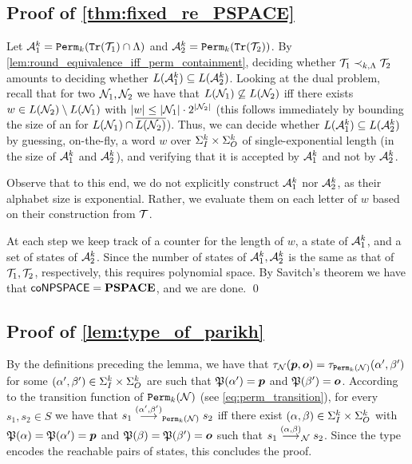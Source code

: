 \subsection{Proof of \autoref{thm:fixed_re_PSPACE}}
\label{apx:fixed_re_PSPACE}
	Let $\mathcal{A}_1^k={\mathtt{Perm}}_k({\mathtt{Tr}}(\mathcal{T}_1)\cap \Lambda)$ and $\mathcal{A}_2^k={\mathtt{Perm}}_k({\mathtt{Tr}}(\mathcal{T}_2))$. By \autoref{lem:round_equivalence_iff_perm_containment}, deciding whether $\mathcal{T}_1\prec_{k,\Lambda} \mathcal{T}_2$ amounts to deciding whether $L(\mathcal{A}^k_1)\subseteq L(\mathcal{A}^k_2)$. Looking at the dual problem, recall that for two \NFAs $\mathcal{N}_1, \mathcal{N}_2$ we have that $L(\mathcal{N}_1)\not\subseteq L(\mathcal{N}_2)$ iff 
	there exists $w\in L(\mathcal{N}_2)\setminus L(\mathcal{N}_1)$ with $|w|\le |\mathcal{N}_1|\cdot 2^{|\mathcal{N}_2|}$ (this follows immediately by bounding the size of an \NFA for $L(\mathcal{N}_1)\cap \overline{L(\mathcal{N}_2)}$). Thus, we can decide whether $L(\mathcal{A}^k_1)\subseteq L(\mathcal{A}^k_2)$ by guessing, on-the-fly, a word $w$ over $\Sigma_{I}^k\times \Sigma_{O}^k$ of single-exponential length (in the size of $\mathcal{A}^k_1$ and $\mathcal{A}^k_2$), and verifying that it is accepted by $\mathcal{A}^k_1$ and not by $\mathcal{A}^k_2$. 
	
	Observe that to this end, we do not explicitly construct $\mathcal{A}^k_1$ nor $\mathcal{A}^k_2$, as their alphabet size is exponential. Rather, we evaluate them on each letter of $w$ based on their construction from $\mathcal{T}$. 
	
	At each step we keep track of a counter for the length of $w$, a state of $\mathcal{A}^k_1$, and a set of states of $\mathcal{A}^k_2$. Since the number of states of $\mathcal{A}^k_1,\mathcal{A}^k_2$ is the same as that of $\mathcal{T}_1,\mathcal{T}_2$, respectively, this requires polynomial space. By Savitch's theorem we have that $\mathsf{coNPSPACE}=\textbf{PSPACE}$, and we are done. \qed

\subsection{Proof of \autoref{lem:type_of_parikh}}
\label{apx:type_of_parikh}
	By the definitions preceding the lemma, we have that $\tau_{\mathcal{N}}(\boldsymbol{p},\boldsymbol{o})=\tau_{{\mathtt{Perm}}_k(\mathcal{N})}(\alpha',\beta')$ for some $(\alpha',\beta')\in \Sigma_{I}^k\times \Sigma_{O}^k$ are such that $\mathfrak{P}(\alpha')=\boldsymbol{p}$ and $\mathfrak{P}(\beta')=\boldsymbol{o}$. According to the transition function of ${\mathtt{Perm}}_k(\mathcal{N})$ (see \autoref{eq:perm_transition}), for every $s_1,s_2\in S$ we have that $s_1\stackrel{(\alpha',\beta')}{\longrightarrow}_{{\mathtt{Perm}}_k(\mathcal{N})}s_2$ iff there exist $(\alpha,\beta)\in \Sigma_{I}^k\times \Sigma_{O}^k$ with $\mathfrak{P}(\alpha)=\mathfrak{P}(\alpha')=\boldsymbol{p}$ and $\mathfrak{P}(\beta)=\mathfrak{P}(\beta')=\boldsymbol{o}$ such that $s_1\stackrel{(\alpha,\beta)}{\longrightarrow}_{\mathcal{N}}s_2$. Since the type encodes the reachable pairs of states, this concludes the proof.

